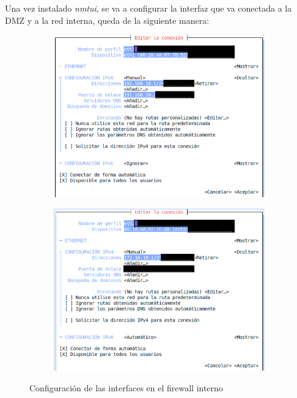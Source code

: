 \documentclass[11pt]{report}
\begin{document}
Una vez instalado \emph{nmtui}, se va a configurar la interfaz que va conectada a la DMZ y a la red interna, queda de la siguiente
manera:
\begin{figure}[H]
  \begin{subfigure}{0.5\textwidth}
    \centering
    \includegraphics[scale=0.42]{img/fw-interno_interface_to_DMZ.png}
  \end{subfigure}%
  \begin{subfigure}{0.5\textwidth}
    \centering
    \includegraphics[scale=0.42]{img/fw-interno_interface_to_LAN.png}
  \end{subfigure}
  \caption{Configuración de las interfaces en el firewall interno}
\end{figure}
\end{document}
